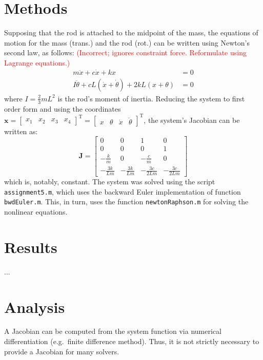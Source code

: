 \documentclass{article}
\begin{document}
	\section*{Methods}
	Supposing that the rod is attached to the midpoint of the mass, the equations of motion for the mass (trans.) and the rod (rot.) can be written using Newton's second law, as follows: \textcolor{red}{(Incorrect; ignores constraint force. Reformulate using Lagrange equations.)}
	\begin{equation}
		\begin{aligned}
		m \ddot{x} + c \dot{x} + k x &= 0\\
		I \ddot{\theta} + c L (\dot{x} + \dot{\theta}) + 2 k L (x + \theta) &= 0
		\end{aligned}
	\end{equation}
	where $I = \frac{2}{3} m L^2$ is the rod's moment of inertia. Reducing the system to first order form and using the coordinates $\bm{x} = \begin{bmatrix} x_1 & x_2 & x_3 & x_4 \end{bmatrix}^\text{T} = \begin{bmatrix} x & \theta & \dot{x} & \dot{\theta} \end{bmatrix}^\text{T}$, the system's Jacobian can be written as:
	\begin{equation}
		\mathbf{J} = \begin{bmatrix}
		0 & 0 & 1 & 0 \\
		0 & 0 & 0 & 1 \\
		-\frac{k}{m} & 0 & -\frac{c}{m} & 0 \\
		-\frac{3 k}{L m} & -\frac{3 k}{L m} & -\frac{3 c}{2 L m} & -\frac{3 c}{2 L m}
		\end{bmatrix}
	\end{equation}
	which is, notably, constant. The system was solved using the script \texttt{assignment5.m}, which uses the backward Euler implementation of function \texttt{bwdEuler.m}. This, in turn, uses the function \texttt{newtonRaphson.m} for solving the nonlinear equations.
	
	\section*{Results}
	...

	\section*{Analysis}
	A Jacobian can be computed from the system function via numerical differentiation (e.g.~finite difference method). Thus, it is not strictly necessary to provide a Jacobian for many solvers.
	
\end{document}
